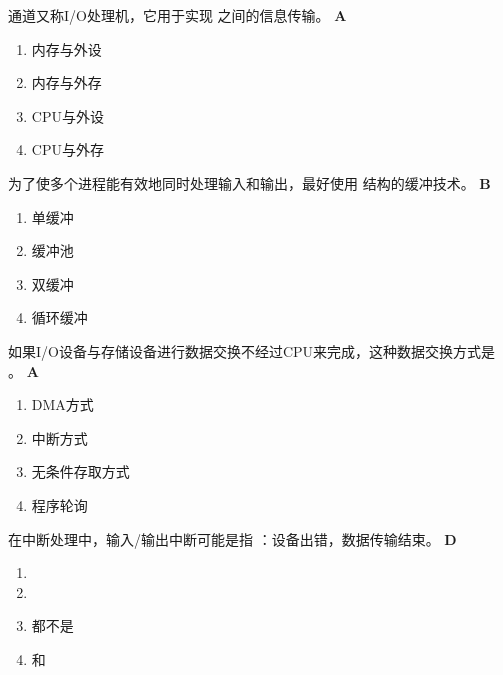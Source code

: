 \begin{problem}
	通道又称I/O处理机，它用于实现 \myline 之间的信息传输。
	\textbf{A}
	\vspace{-0.5em}
	\begin{multicols}{4}
		\begin{enumerate}[label=\Alph*.]
			\item 内存与外设
			\item 内存与外存
			\item CPU与外设
			\item CPU与外存
		\end{enumerate}
	\end{multicols}
	\vspace{-1em}
\end{problem}


\begin{problem}
	为了使多个进程能有效地同时处理输入和输出，最好使用 \myline 结构的缓冲技术。
	\textbf{B}
	\vspace{-0.5em}
	\begin{multicols}{4}
		\begin{enumerate}[label=\Alph*.]
			\item 单缓冲
			\item 缓冲池
			\item 双缓冲
			\item 循环缓冲
		\end{enumerate}
	\end{multicols}
	\vspace{-1em}
\end{problem}


\begin{problem}
	如果I/O设备与存储设备进行数据交换不经过CPU来完成，这种数据交换方式是 \myline。
	\textbf{A}
	\vspace{-0.5em}
	\begin{multicols}{4}
		\begin{enumerate}[label=\Alph*.]
			\item DMA方式
			\item 中断方式
			\item 无条件存取方式
			\item 程序轮询
		\end{enumerate}
	\end{multicols}
	\vspace{-1em}
\end{problem}


\begin{problem}
	​在中断处理中，输入/输出中断可能是指 \myline：设备出错，数据传输结束。
	\textbf{D}
	\vspace{-0.5em}
	\begin{multicols}{4}
		\begin{enumerate}[label=\Alph*.]
			\item {}
			\item {}
			\item 都不是
			\item {}和
		\end{enumerate}
	\end{multicols}
	\vspace{-1em}
\end{problem}


